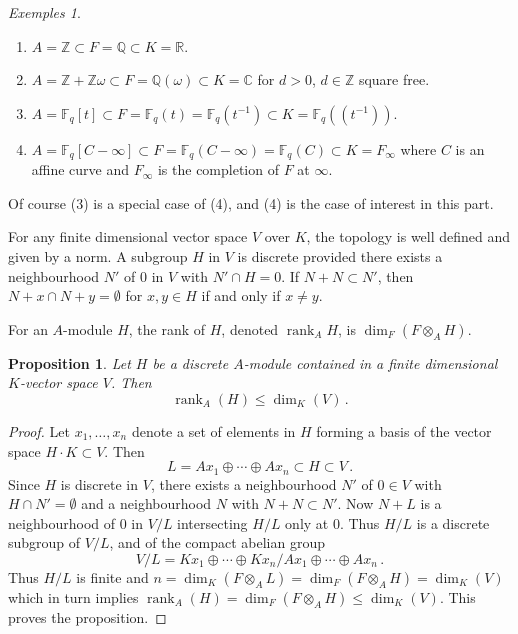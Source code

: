 \documentclass[12pt,a4paper]{article}
\theoremstyle{plain}
\newtheorem{proposition}{Proposition}[section]
\theoremstyle{definition}
\theoremstyle{remark}
\newtheorem{examples}{Exemples}[section]
\DeclareMathOperator{\rank}{rank}
\begin{document}
\begin{examples}
\begin{enumerate}[label=(\arabic*)]
\item $A = \mathbb{Z} \subset F = \mathbb{Q} \subset K = \mathbb{R}$.
\item $A = \mathbb{Z} + \mathbb{Z}\omega \subset F = \mathbb{Q}(\omega) \subset K = \mathbb{C}$ 
for $d > 0$, $d \in \mathbb{Z}$ square free.
\item $A = \mathbb{F}_q[t] \subset F = \mathbb{F}_q(t) = \mathbb{F}_q(t^{-1}) \subset K = \mathbb{F}_q((t^{-1}))$.
\item $A = \mathbb{F}_q[C - \infty] \subset F = \mathbb{F}_q(C - \infty) = \mathbb{F}_q(C) \subset K = F_\infty$ 
where $C$ is an affine curve and $F_\infty$ is the completion of $F$ at $\infty$.
\end{enumerate}
Of course (3) is a special case of (4), and (4) is the case of interest in 
this part.
\end{examples}

For any finite dimensional vector space $V$ over $K$, the topology is well 
defined and given by a norm. A subgroup $H$ in $V$ is discrete provided there 
exists a neighbourhood $N'$ of $0$ in $V$ with $N' \cap H = 0$. If 
$N + N \subset N'$, then $N + x \cap N + y = \emptyset$ for $x, y \in H$ if 
and only if $x \neq y$.

For an $A$-module $H$, the rank of $H$, denoted $\rank_A H$, is 
$\dim_F(F \otimes_A H)$.

\begin{proposition}
Let $H$ be a discrete $A$-module contained in a finite dimensional 
$K$-vector space $V$. Then
\[
\rank_A(H) \leqslant \dim_K(V) \,.
\]
\end{proposition}

\begin{proof}
Let $x_1, \ldots, x_n$ denote a set of elements in $H$ forming a basis of the 
vector space $H \cdot K \subset V$. Then
\[
L = Ax_1 \oplus \cdots \oplus Ax_n \subset H \subset V \,.
\]
Since $H$ is discrete in $V$, there exists a neighbourhood $N'$ of $0 \in V$ 
with $H \cap N' = \emptyset$ and a neighbourhood $N$ with $N + N \subset N'$. 
Now $N + L$ is a neighbourhood of $0$ in $V/L$ intersecting $H/L$ only at $0$. 
Thus $H/L$ is a discrete subgroup of $V/L$, and of the compact abelian group
\[
V/L = Kx_1 \oplus \cdots \oplus Kx_n / Ax_1 \oplus \cdots \oplus Ax_n \,.
\]
Thus $H/L$ is finite and $n = \dim_K(F \otimes_A L) = \dim_F(F \otimes_A H) = \dim_K(V)$ 
which in turn implies $\rank_A(H) = \dim_F(F \otimes_A H) \leqslant \dim_K(V)$. 
This proves the proposition.
\end{proof}
\end{document}
